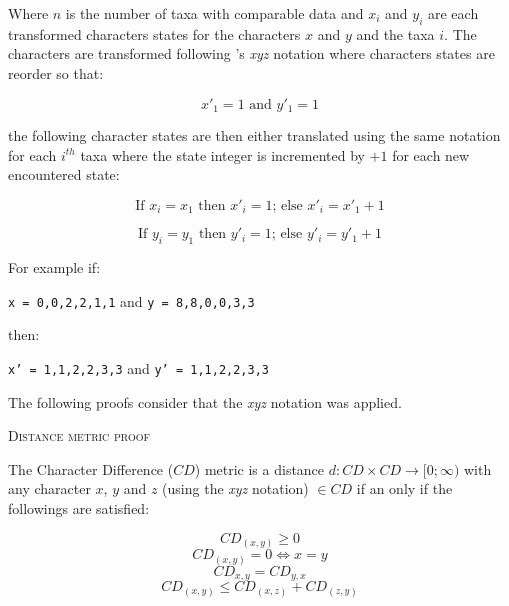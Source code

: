 \documentclass[12pt,letterpaper]{article}
\renewcommand{\section}[1]{%
\bigskip
\begin{center}
\begin{Large}
\normalfont\scshape #1
\medskip
\end{Large}
\end{center}}
\begin{document}
\noindent Where $n$ is the number of taxa with comparable data and $x_i$ and $y_i$ are each transformed characters states for the characters $x$ and $y$ and the taxa $i$.
The characters are transformed following \cite{felsenstein2004inferring}'s \textit{xyz} notation where characters states are reorder so that:

\begin{equation}
x'_1 = 1 \text{ and } y'_1 = 1
\end{equation}

\noindent the following character states are then either translated using the same notation for each $i^{th}$ taxa where the state integer is incremented by $+1$ for each new encountered state:

\begin{equation}
\text{If } x_i = x_1 \text{ then } x'_i = 1 \text{; else } x'_i = x'_1 + 1
\end{equation}

\begin{equation}
\text{If } y_i = y_1 \text{ then } y'_i = 1 \text{; else } y'_i = y'_1 + 1
\end{equation}

\noindent For example if:

\texttt{x = {0,0,2,2,1,1}} and \texttt{y = {8,8,0,0,3,3}}

\noindent then:

\texttt{x' = {1,1,2,2,3,3}} and \texttt{y' = {1,1,2,2,3,3}}


\noindent The following proofs consider that the \textit{xyz} notation was applied.


\section{Distance metric proof}

The Character Difference ($CD$) metric is a distance $d: CD \times CD \rightarrow [0;\infty)$ with any character $x$, $y$ and $z$ (using the \textit{xyz} notation) $\in CD$ if an only if the followings are satisfied:

\begin{equation}
    \label{Positivity}
    CD_{(x,y)} \geq 0
\end{equation}
\begin{equation}
    \label{Identity}
    CD_{(x,y)} = 0 \Leftrightarrow x = y
\end{equation}
\begin{equation}
    \label{Equality}
    CD_{x,y} = CD_{y,x}
\end{equation}
\begin{equation}
    \label{Subadditivity}
    CD_{(x,y)} \leq CD_{(x,z)} + CD_{(z,y)}
\end{equation}
\end{document}

